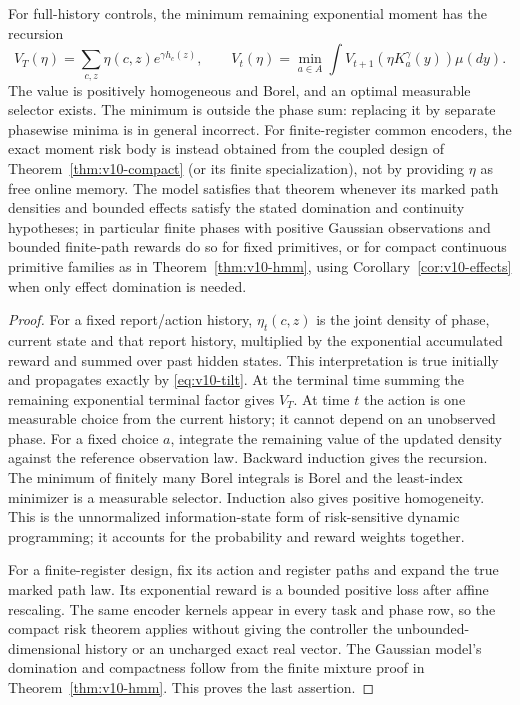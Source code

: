 \begin{theorem}\label{thm:v10-phase}
For full-history controls, the minimum remaining exponential moment
has the recursion
\[
 V_T(\eta)=\sum_{c,z}\eta(c,z)e^{\gamma h_c(z)},\qquad
 V_t(\eta)=\min_{a\in A}\int
          V_{t+1}(\eta K_a^\gamma(y))\mu(dy).
\]
The value is positively homogeneous and Borel, and an optimal
measurable selector exists. The minimum is outside the phase sum:
replacing it by separate phasewise minima is in general incorrect.
For finite-register common encoders, the exact moment risk body is
instead obtained from the coupled design of
Theorem~\ref{thm:v10-compact} (or its finite specialization), not by
providing $\eta$ as free online memory. The model satisfies that
theorem whenever its marked path densities and bounded effects
satisfy the stated domination and continuity hypotheses; in
particular finite phases with positive Gaussian observations and
bounded finite-path rewards do so for fixed primitives, or for compact
continuous primitive families as in Theorem~\ref{thm:v10-hmm}, using
Corollary~\ref{cor:v10-effects} when only effect domination is needed.
\end{theorem}
\begin{proof}
For a fixed report/action history, $\eta_t(c,z)$ is the joint density
of phase, current state and that report history, multiplied by the
exponential accumulated reward and summed over past hidden states.
This interpretation is true initially and propagates exactly by
\eqref{eq:v10-tilt}. At the terminal time summing the remaining
exponential terminal factor gives $V_T$. At time $t$ the action is
one measurable choice from the current history; it cannot depend on
an unobserved phase. For a fixed choice $a$, integrate the remaining
value of the updated density against the reference observation law.
Backward induction gives the recursion. The minimum of finitely
many Borel integrals is Borel and the least-index minimizer is a
measurable selector. Induction also gives positive homogeneity.
This is the unnormalized information-state form of risk-sensitive
dynamic programming; it accounts for the probability and reward
weights together.

For a finite-register design, fix its action and register paths and
expand the true marked path law. Its exponential reward is a bounded
positive loss after affine rescaling. The same encoder kernels appear
in every task and phase row, so the compact risk theorem applies
without giving the controller the unbounded-dimensional history or
an uncharged exact real vector. The Gaussian model's domination and
compactness follow from the finite mixture proof in
Theorem~\ref{thm:v10-hmm}. This proves the last assertion.
\end{proof}

